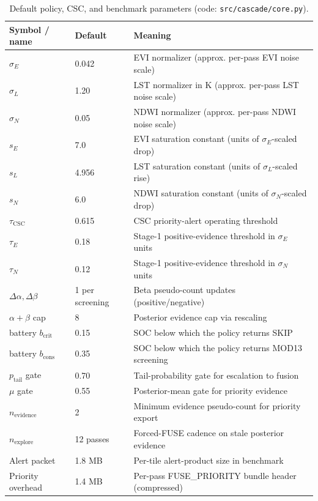 \documentclass[11pt]{article}
\begin{document}
\begin{table}[H]
\centering
\caption{Default policy, CSC, and benchmark parameters (code: \texttt{src/cascade/core.py}).}
\label{tab:default-params}
\begin{tabular}{lll}
\toprule
Symbol / name & Default & Meaning \\
\midrule
$\sigma_E$ & 0.042 & EVI normalizer (approx. per-pass EVI noise scale) \\
$\sigma_L$ & 1.20 & LST normalizer in K (approx. per-pass LST noise scale) \\
$\sigma_N$ & 0.05 & NDWI normalizer (approx. per-pass NDWI noise scale) \\
$s_E$ & 7.0 & EVI saturation constant (units of $\sigma_E$-scaled drop) \\
$s_L$ & 4.956 & LST saturation constant (units of $\sigma_L$-scaled rise) \\
$s_N$ & 6.0 & NDWI saturation constant (units of $\sigma_N$-scaled drop) \\
$\tau_\mathrm{CSC}$ & 0.615 & CSC priority-alert operating threshold \\
$\tau_E$ & 0.18 & Stage-1 positive-evidence threshold in $\sigma_E$ units \\
$\tau_N$ & 0.12 & Stage-1 positive-evidence threshold in $\sigma_N$ units \\
$\Delta\alpha,\Delta\beta$ & 1 per screening & Beta pseudo-count updates (positive/negative) \\
$\alpha+\beta$ cap & 8 & Posterior evidence cap via rescaling \\
battery $b_\mathrm{crit}$ & 0.15 & SOC below which the policy returns SKIP \\
battery $b_\mathrm{cons}$ & 0.35 & SOC below which the policy returns MOD13 screening \\
$p_\mathrm{tail}$ gate & 0.70 & Tail-probability gate for escalation to fusion \\
$\mu$ gate & 0.55 & Posterior-mean gate for priority evidence \\
$n_\mathrm{evidence}$ & 2 & Minimum evidence pseudo-count for priority export \\
$n_\mathrm{explore}$ & 12 passes & Forced-FUSE cadence on stale posterior evidence \\
Alert packet & 1.8 MB & Per-tile alert-product size in benchmark \\
Priority overhead & 1.4 MB & Per-pass FUSE\_PRIORITY bundle header (compressed) \\
\bottomrule
\end{tabular}
\end{table}
\end{document}
